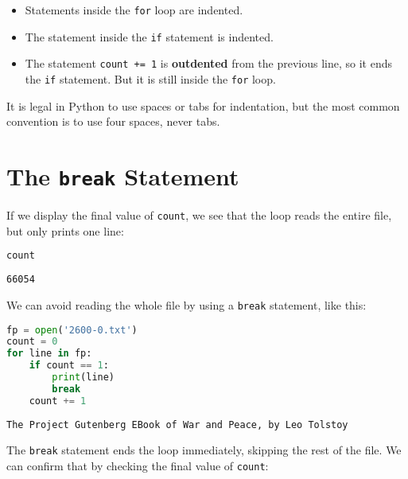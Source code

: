 \begin{itemize}
\item
  Statements inside the \passthrough{\lstinline!for!} loop are indented.
\item
  The statement inside the \passthrough{\lstinline!if!} statement is
  indented.
\item
  The statement \passthrough{\lstinline!count += 1!} is
  \textbf{outdented} from the previous line, so it ends the
  \passthrough{\lstinline!if!} statement. But it is still inside the
  \passthrough{\lstinline!for!} loop.
\end{itemize}

It is legal in Python to use spaces or tabs for indentation, but the
most common convention is to use four spaces, never tabs.

\hypertarget{the-break-statement}{%
\section{\texorpdfstring{The \texttt{break}
Statement}{The break Statement}}\label{the-break-statement}}

If we display the final value of \passthrough{\lstinline!count!}, we see
that the loop reads the entire file, but only prints one line:

\begin{lstlisting}[language=Python,style=source]
count
\end{lstlisting}

\begin{lstlisting}[style=output]
66054
\end{lstlisting}

We can avoid reading the whole file by using a
\passthrough{\lstinline!break!} statement, like this:

\begin{lstlisting}[language=Python,style=source]
fp = open('2600-0.txt')
count = 0
for line in fp:
    if count == 1:
        print(line)
        break
    count += 1
\end{lstlisting}

\begin{lstlisting}[style=output]
The Project Gutenberg EBook of War and Peace, by Leo Tolstoy
\end{lstlisting}

The \passthrough{\lstinline!break!} statement ends the loop immediately,
skipping the rest of the file. We can confirm that by checking the final
value of \passthrough{\lstinline!count!}:

